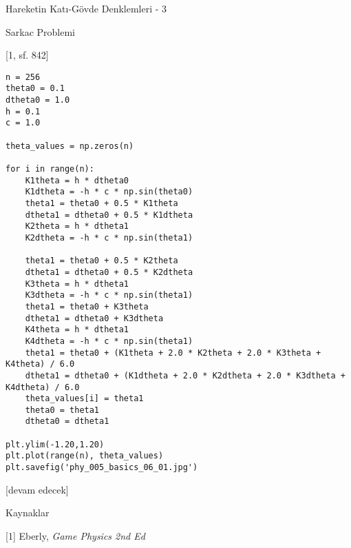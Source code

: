\documentclass[12pt,fleqn]{article}\usepackage{../../common}
\begin{document}
Hareketin Katı-Gövde Denklemleri - 3

Sarkac Problemi

[1, sf. 842]

\begin{verbatim}
n = 256
theta0 = 0.1
dtheta0 = 1.0
h = 0.1
c = 1.0

theta_values = np.zeros(n)

for i in range(n):
    K1theta = h * dtheta0
    K1dtheta = -h * c * np.sin(theta0)
    theta1 = theta0 + 0.5 * K1theta
    dtheta1 = dtheta0 + 0.5 * K1dtheta
    K2theta = h * dtheta1
    K2dtheta = -h * c * np.sin(theta1)

    theta1 = theta0 + 0.5 * K2theta
    dtheta1 = dtheta0 + 0.5 * K2dtheta
    K3theta = h * dtheta1
    K3dtheta = -h * c * np.sin(theta1)
    theta1 = theta0 + K3theta
    dtheta1 = dtheta0 + K3dtheta
    K4theta = h * dtheta1
    K4dtheta = -h * c * np.sin(theta1)
    theta1 = theta0 + (K1theta + 2.0 * K2theta + 2.0 * K3theta + K4theta) / 6.0
    dtheta1 = dtheta0 + (K1dtheta + 2.0 * K2dtheta + 2.0 * K3dtheta + K4dtheta) / 6.0
    theta_values[i] = theta1
    theta0 = theta1
    dtheta0 = dtheta1

plt.ylim(-1.20,1.20)
plt.plot(range(n), theta_values)
plt.savefig('phy_005_basics_06_01.jpg')
\end{verbatim}














[devam edecek]

Kaynaklar

[1] Eberly, {\em Game Physics 2nd Ed}
\end{document}
